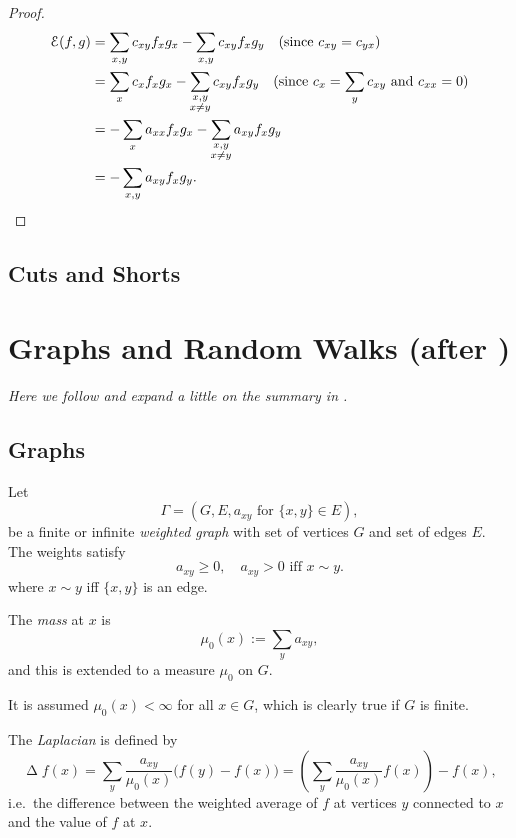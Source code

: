 \documentclass[a4paper]{amsart}
\theoremstyle{plain}
\theoremstyle{definition}
\theoremstyle{remark}
\DeclareMathOperator{\lap}{\Delta}
\begin{document}
\begin{proof}
 \begin{align*}
\mathcal{E}(f,g) &= \sum_{x,y} c_{xy}f_x g_x - \sum_{x,y} c_{xy} f_x g_y \quad  
                            \text{(since  $ c_{xy}= c_{yx}$)} \\
   &= \sum_{x} c_x f_x g_x - \sum_{\substack{x,y \\ x\neq y}} c_{xy}f_x g_y \quad 
                                         \text{(since  $ c_{x}= \sum_y c_{xy}$ and $ c_{xx} = 0 $)} \\
   &= -\sum_{x} a_{xx} f_x g_x - \sum_{\substack{x,y \\ x\neq y}} a_{xy}f_x g_y\\
   &= -\sum_{x,y} a_{xy} f_x g_y.
\end{align*}
\end{proof} 

\subsection{Cuts and Shorts}





\section{\textbf{Graphs and Random Walks}  (after \cite{Bar3})}

\emph{Here we follow and expand a little on the summary in \cite{Bar3}.} 

\subsection{Graphs}
Let 
\[
 \Gamma = (G,E, a_{xy} \text{ for } \{x,y\}\in E ),
 \] 
 be a finite or infinite \emph{weighted graph} with set of vertices $ G $ and set of edges $ E $.
The weights satisfy 
\[
a_{xy}\geq 0, \quad a_{xy} >0 \text{ iff } x \sim y .
\]
where $ x\sim y $ iff $ \{x,y\} $ is an edge.

\medskip
The \emph{mass} at  $ x $ is 
\[
\mu_0(x) := \sum_y a_{xy },
\] 
and this is extended to a measure $ \mu_0 $ on $ G $.

It is assumed $ \mu_0(x) < \infty $ for all $ x\in G $, which is clearly true if $ G $ is finite.

\medskip The \emph{Laplacian} is defined by
\[
\lap f(x)  =  \sum_y  \frac{a_{xy}}{\mu_0(x) } \big( f(y) - f(x) \big)  
               =    \left( \sum_y  \frac{a_{xy}}{\mu_0(x) }   f(x) \right) - f(x ),
\]
i.e.\ the difference between the weighted average of $ f $ at vertices $ y $ connected to $ x $ and the value of $ f $ at $ x $.
\end{document}
